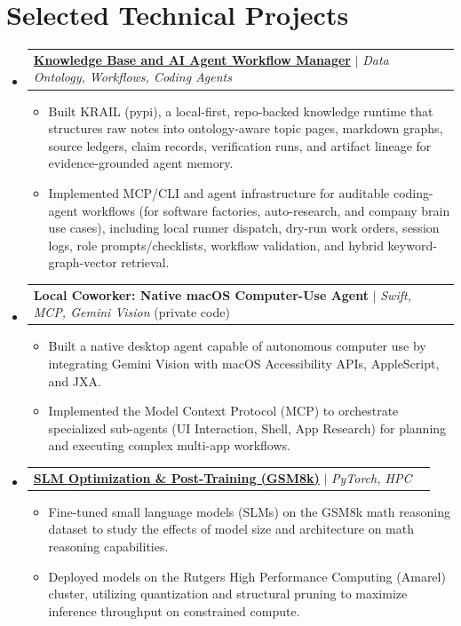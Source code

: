 \documentclass[letterpaper,11pt]{article}
\makeatletter
\newcommand{\resumeItem}[1]{
  \item\small{
    {#1 \vspace{-2pt}}
  }
}
\newcommand{\resumeProjectHeading}[2]{
    \item
    \begin{tabular*}{0.97\textwidth}{l@{\extracolsep{\fill}}r}
      \small#1 & #2 \\
    \end{tabular*}\vspace{-7pt}
}
\newcommand{\resumeSubHeadingListStart}{\begin{itemize}[leftmargin=0.15in, label={}]}
\newcommand{\resumeSubHeadingListEnd}{\end{itemize}}
\newcommand{\resumeItemListStart}{\begin{itemize}}
\newcommand{\resumeItemListEnd}{\end{itemize}\vspace{-5pt}}
\makeatother
\begin{document}
\section{Selected Technical Projects}
    \resumeSubHeadingListStart
      \resumeProjectHeading
          {\href{https://github.com/AkeBoss-tech/knowledge}{\textbf{Knowledge Base and AI Agent Workflow Manager}} $|$ \emph{Data Ontology, Workflows, Coding Agents} }{}
          \resumeItemListStart
            \resumeItem{Built KRAIL (pypi), a local-first, repo-backed knowledge runtime that structures raw notes into ontology-aware topic pages, markdown graphs, source ledgers, claim records, verification runs, and artifact lineage for evidence-grounded agent memory.}
            \resumeItem{Implemented MCP/CLI and agent infrastructure for auditable coding-agent workflows (for software factories, auto-research, and company brain use cases), including local runner dispatch, dry-run work orders, session logs, role prompts/checklists, workflow validation, and hybrid keyword-graph-vector retrieval.}
          \resumeItemListEnd

      \resumeProjectHeading
          {\textbf{Local Coworker: Native macOS Computer-Use Agent} $|$ \emph{Swift, MCP, Gemini Vision} (private code)}{}
          \resumeItemListStart
            \resumeItem{Built a native desktop agent capable of autonomous computer use by integrating Gemini Vision with macOS Accessibility APIs, AppleScript, and JXA.}
            \resumeItem{Implemented the Model Context Protocol (MCP) to orchestrate specialized sub-agents (UI Interaction, Shell, App Research) for planning and executing complex multi-app workflows.}
          \resumeItemListEnd

      \resumeProjectHeading
          {\href{https://github.com/AkeBoss-tech/llm-research}{\textbf{SLM Optimization \& Post-Training (GSM8k)}} $|$ \emph{PyTorch, HPC}}{}
          \resumeItemListStart
            \resumeItem{Fine-tuned small language models (SLMs) on the GSM8k math reasoning dataset to study the effects of model size and architecture on math reasoning capabilities.}
            \resumeItem{Deployed models on the Rutgers High Performance Computing (Amarel) cluster, utilizing quantization and structural pruning to maximize inference throughput on constrained compute.}
          \resumeItemListEnd

    \resumeSubHeadingListEnd
\end{document}
